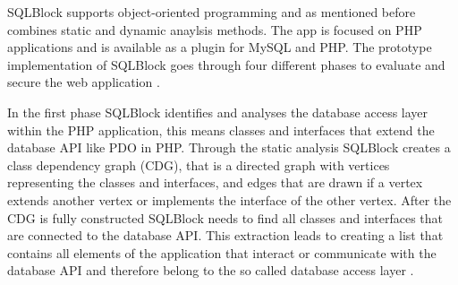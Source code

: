 SQLBlock supports object-oriented programming and as mentioned before combines static and dynamic anaylsis methods. The app is focused on PHP applications and is available as a plugin for MySQL and PHP. The prototype implementation of SQLBlock goes through four different phases to evaluate and secure the web application \autocite[1, 5]{Jahanshahi2018}.\newline


In the first phase SQLBlock identifies and analyses the database access layer within the PHP application, this means classes and interfaces that extend the database API like PDO in PHP. Through the static analysis SQLBlock creates a class dependency graph (CDG), that is a directed graph with vertices representing the classes and interfaces, and edges that are drawn if a vertex extends another vertex or implements the interface of the other vertex. After the CDG is fully constructed SQLBlock needs to find all classes and interfaces that are connected to the database API. This extraction leads to creating a list that contains all elements of the application that interact or communicate with the database API and therefore belong to the so called database access layer \autocite[3, 6]{Jahanshahi2018}.\newline


